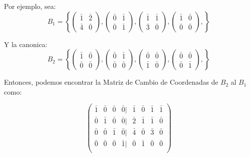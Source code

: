 \documentclass[12pt]{report}							    %
\begin{document}
        Por ejemplo, sea:
        \begin{equation*}
            B_1 = \left\{
                \begin{pmatrix}\bar{1}&\bar{2}\\\bar{4}&\bar{0}\end{pmatrix},
                \begin{pmatrix}\bar{0}&\bar{1}\\\bar{0}&\bar{1}\end{pmatrix},
                \begin{pmatrix}\bar{1}&\bar{1}\\\bar{3}&\bar{0}\end{pmatrix},
                \begin{pmatrix}\bar{1}&\bar{0}\\\bar{0}&\bar{0}\end{pmatrix},
            \right\}
        \end{equation*}

        Y la canonica:
        \begin{equation*}
            B_2 = \left\{
                \begin{pmatrix}\bar{1}&\bar{0}\\\bar{0}&\bar{0}\end{pmatrix},
                \begin{pmatrix}\bar{0}&\bar{1}\\\bar{0}&\bar{0}\end{pmatrix},
                \begin{pmatrix}\bar{0}&\bar{0}\\\bar{1}&\bar{0}\end{pmatrix},
                \begin{pmatrix}\bar{0}&\bar{0}\\\bar{0}&\bar{1}\end{pmatrix},
            \right\}
        \end{equation*}

        Entonces, podemos encontrar la Matriz de Cambio de Coordenadas de $B_2$ al $B_1$ como:


        \begin{equation*}
            \begin{pmatrix}
                \bar{1} & \bar{0} & \bar{0} & \bar{0} | & \bar{1} & \bar{0} & \bar{1} & \bar{1} \\
                \bar{0} & \bar{1} & \bar{0} & \bar{0} | & \bar{2} & \bar{1} & \bar{1} & \bar{0} \\
                \bar{0} & \bar{0} & \bar{1} & \bar{0} | & \bar{4} & \bar{0} & \bar{3} & \bar{0} \\
                \bar{0} & \bar{0} & \bar{0} & \bar{1} | & \bar{0} & \bar{1} & \bar{0} & \bar{0} \\
            \end{pmatrix}
        \end{equation*}
\end{document}
